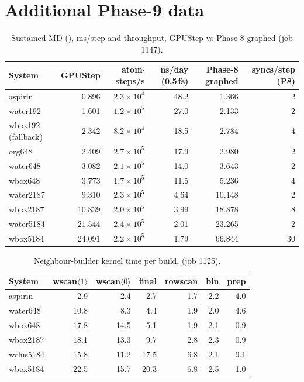 \section{Additional Phase-9 data}

\begin{table}[H]
\centering
\caption{Sustained MD (\Bthree), ms/step and throughput, GPUStep vs Phase-8 graphed (job 1147).}
\small
\begin{tabular}{lrrrrr}
\toprule
System & GPUStep & atom$\cdot$steps/s & ns/day (0.5\,fs) & Phase-8 graphed & syncs/step (P8) \\
\midrule
aspirin & 0.896 & $2.3\times10^4$ & 48.2 & 1.366 & 2 \\
water192 & 1.601 & $1.2\times10^5$ & 27.0 & 2.133 & 2 \\
wbox192 (fallback) & 2.342 & $8.2\times10^4$ & 18.5 & 2.784 & 4 \\
org648 & 2.409 & $2.7\times10^5$ & 17.9 & 2.980 & 2 \\
water648 & 3.082 & $2.1\times10^5$ & 14.0 & 3.643 & 2 \\
wbox648 & 3.773 & $1.7\times10^5$ & 11.5 & 5.236 & 4 \\
water2187 & 9.310 & $2.3\times10^5$ & 4.64 & 10.148 & 2 \\
wbox2187 & 10.839 & $2.0\times10^5$ & 3.99 & 18.878 & 8 \\
water5184 & 21.544 & $2.4\times10^5$ & 2.01 & 23.265 & 2 \\
wbox5184 & 24.091 & $2.2\times10^5$ & 1.79 & 66.844 & 30 \\
\bottomrule
\end{tabular}
\end{table}

\begin{table}[H]
\centering
\caption{Neighbour-builder kernel time per build, \us{} (job 1125).}
\small
\begin{tabular}{lrrrrrr}
\toprule
System & wscan$\langle1\rangle$ & wscan$\langle0\rangle$ & final & rowscan & bin & prep \\
\midrule
aspirin & 2.9 & 2.4 & 2.7 & 1.7 & 2.2 & 4.0 \\
water648 & 10.8 & 8.3 & 4.4 & 1.9 & 2.0 & 4.6 \\
wbox648 & 17.8 & 14.5 & 5.1 & 1.9 & 2.1 & 0.9 \\
wbox2187 & 18.1 & 13.3 & 9.7 & 2.8 & 2.3 & 0.9 \\
wclus5184 & 15.8 & 11.2 & 17.5 & 6.8 & 2.1 & 9.1 \\
wbox5184 & 22.5 & 15.7 & 20.3 & 6.8 & 2.5 & 1.0 \\
\bottomrule
\end{tabular}
\end{table}

